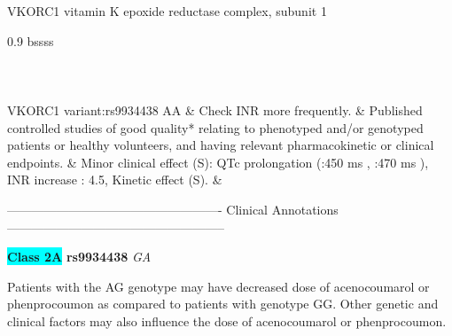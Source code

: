 \documentclass{resume} %
\begin{document}
\begin{rSubsection}{ VKORC1 }{ vitamin K epoxide reductase complex, subunit 1 }{}{}
\begin{center}
\begin{tabularx}{0.9\textwidth}{ bssss }
\\
		\vspace{1pt}\\
		\hline \\
		\vspace{1pt}\\
		         VKORC1 variant:rs9934438 AA & Check INR more frequently. & Published controlled studies of good quality* relating to phenotyped and/or genotyped patients or healthy volunteers, and having relevant pharmacokinetic or clinical endpoints. & Minor clinical effect (S): QTc prolongation (:450 ms , :470 ms ),  INR increase : 4.5,  Kinetic effect (S). &
\\
		\end{tabularx}
		\end{center}
		\normalsize
		\vspace{10pt}
		        
\item[] ---------------------------------------------------- Clinical Annotations -----------------------------------------------------\newline
\item \textbf{\colorbox{cyan} {Class 2A}} \textbf{ rs9934438 } \textit{ GA }
\item[] Patients with the AG genotype may have decreased dose of acenocoumarol or phenprocoumon as compared to patients with genotype GG. Other genetic and clinical factors may also influence the dose of acenocoumarol or phenprocoumon.
\end{rSubsection}
\end{document}
